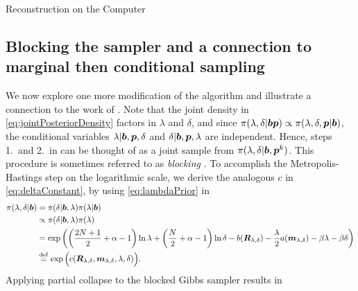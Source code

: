 \begin{chapter}{Reconstruction on the Computer}
\subsection{Blocking the sampler and a connection to marginal then conditional sampling}

We now explore one more modification of the algorithm and illustrate a connection to the work of \citep{fox2015fast}.
Note that the joint density in \eqref{eq:jointPosteriorDensity} factors in $\lambda$ and $\delta$, and since $\pi(\lambda,\delta|\mbox{\boldmath$b$}\mbox{\boldmath$p$}) \propto \pi(\lambda,\delta,\mbox{\boldmath$p$}|\mbox{\boldmath$b$})$, the conditional variables $\lambda|\mbox{\boldmath$b$}, \mbox{\boldmath$p$},\delta$ and $\delta|\mbox{\boldmath$b$},\mbox{\boldmath$p$},\lambda$ are independent.
Hence, steps 1.~and 2.~in  can be thought of as a joint sample from $\pi(\lambda,\delta|\mbox{\boldmath$b$},\mbox{\boldmath$p$}^k)$.
This procedure is sometimes referred to as \emph{blocking} \citep{liu2008monte}.
To accomplish the Metropolis-Hastings step on the logarithmic scale, we derive the analogous $c$ in \eqref{eq:deltaConstant}, by using \eqref{eq:lambdaPrior} in
\begin{align}
  \pi(\lambda,\delta|\mbox{\boldmath$b$}) 
    &=\pi(\delta|\mbox{\boldmath$b$},\lambda)\pi(\lambda|\mbox{\boldmath$b$}) \nonumber\\
    &\propto \pi(\delta|\mbox{\boldmath$b$},\lambda)\pi(\lambda) \nonumber\\
    &= \exp\left( \left(\frac {2N+1}2 +\alpha - 1\right)\ln\lambda + \left(\frac N2 +\alpha - 1\right)\ln\delta - b(\mbox{\boldmath$R$}_{\lambda,\delta}) -\frac \lambda 2 a(\mbox{\boldmath$m$}_{\lambda,\delta}) -\beta\lambda -\beta\delta  \right)\nonumber \\
    &\stackrel{\rm def}{=} \exp\Big(c(\mbox{\boldmath$R$}_{\lambda,\delta},\mbox{\boldmath$m$}_{\lambda,\delta},\lambda,\delta)\Big). \label{eq:jointConstant}
\end{align}
Applying partial collapse to the blocked Gibbs sampler results in 


\end{chapter}
